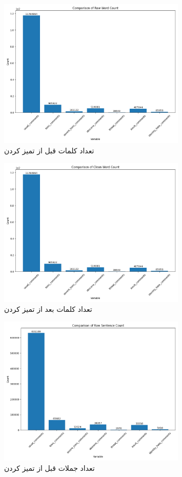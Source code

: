 \clearpage{}

\begin{figure}
  \centering
  \includegraphics[width=0.8\textwidth]{stats/raw_word_count.png}
  \caption{تعداد کلمات قبل از تمیز کردن}
  \label{fig:raw_word_count}
\end{figure}

\begin{figure}
  \centering
  \includegraphics[width=0.8\textwidth]{stats/clean_word_count.png}
  \caption{تعداد کلمات بعد از تمیز کردن}
  \label{fig:clean_word_count}
\end{figure}

\begin{figure}
  \centering
  \includegraphics[width=0.8\textwidth]{stats/raw_sentence_count.png}
  \caption{تعداد جملات قبل از تمیز کردن}
  \label{fig:raw_word_count}
\end{figure}

